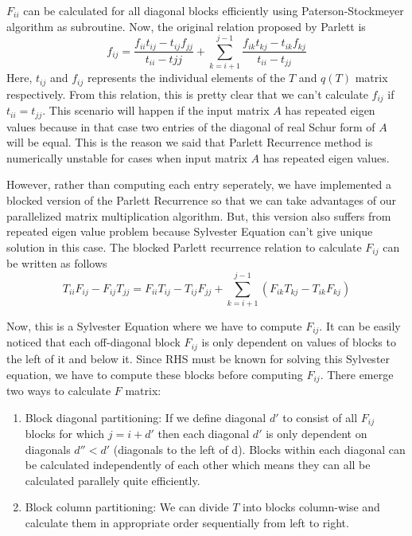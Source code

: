 \documentclass[12pt,a4paper]{article}
\begin{document}
$F_{ii}$ can be calculated for all diagonal blocks efficiently using Paterson-Stockmeyer algorithm as subroutine. Now, the original relation proposed by Parlett is
$$f_{ij} = \frac{f_{ii}t_{ij} - t_{ij}f_{jj}}{t_{ii} - t{jj}} + \sum_{k=i+1}^{j-1}\frac{f_{ik}t_{kj} - t_{ik}f_{kj}}{t_{ii} - t_{jj}}$$
Here, $t_{ij}$ and $f_{ij}$ represents the individual elements of the $T$ and $q(T)$ matrix respectively. From this relation, this is pretty clear that we can't calculate $f_{ij}$ if $t_{ii} = t_{jj}$. This scenario will happen if the input matrix $A$ has repeated eigen values because in that case two entries of the diagonal of real Schur form of $A$ will be equal. This is the reason we said that Parlett Recurrence method is numerically unstable for cases when input matrix $A$ has repeated eigen values.

However, rather than computing each entry seperately, we have implemented a blocked version of the Parlett Recurrence so that we can take advantages of our parallelized matrix multiplication algorithm. But, this version also suffers from repeated eigen value problem because Sylvester Equation can't give unique solution in this case. 
\newpage
The blocked Parlett recurrence relation to calculate $F_{ij}$ can be written as follows 
$$T_{ii}F_{ij} - F_{ij}T_{jj} = F_{ii}T_{ij} - T_{ij}F_{jj} + \sum_{k=i+1}^{j-1}(F_{ik}T_{kj} - T_{ik}F_{kj})$$ 

 Now, this is a Sylvester Equation where we have to compute $F_{ij}$. It can be easily noticed that each off-diagonal block $F_{ij}$ is only dependent on values of blocks to the left of it and below it. Since RHS must be known for solving this Sylvester equation, we have to compute these blocks before computing $F_{ij}$. There emerge two ways to calculate $F$ matrix:
\begin{enumerate}
    \item Block diagonal partitioning: If we define diagonal $d'$ to consist of all $F_{ij}$ blocks for which $j = i + d'$ then each diagonal $d'$ is only dependent on diagonals $d''<d'$ (diagonals to the left of d). Blocks within each diagonal can be calculated independently of each other which means they can all be calculated parallely quite efficiently.  
    \vspace{0.5cm}
    \item Block column partitioning: We can divide $T$ into blocks column-wise and calculate them in appropriate order sequentially from left to right. 
\end{enumerate}
\end{document}

